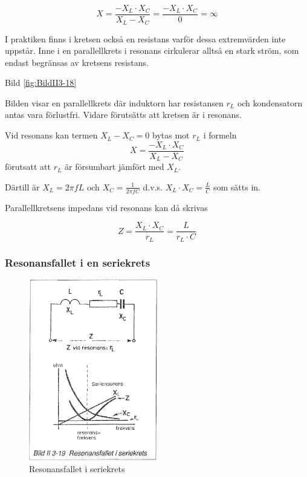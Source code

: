 \[
  X = \frac{-X_L \cdot X_C}{X_L - X_C}
  = \frac{-X_L \cdot X_C}{0}
  = \infty
\]

I praktiken finns i kretsen också en resistans varför dessa extremvärden inte
uppstår. Inne i en parallellkrets i resonans cirkulerar alltså en stark ström,
som endast begränsas av kretsens resistans.

Bild \ref{fig:BildII3-18}

Bilden visar en parallellkrets där induktorn har resistansen \(r_L\) och
kondensatorn antas vara förlustfri. Vidare förutsätts att kretsen är i resonans.

Vid resonans kan termen \(X_L - X_C = 0\) bytas mot \(r_L\) i formeln
\[X = \frac{-X_L \cdot X_C}{X_L - X_C}\] förutsatt att \(r_L\) är försumbart
jämfört med \(X_L\).

Därtill är \(X_L = 2πfL\) och \(X_C = \frac{1}{2πfC}\) d.v.s.
\(X_L \cdot X_C = \frac{L}{C}\) som sätts in.

Parallellkretsens impedans vid resonans kan då skrivas

\[
Z = \frac{X_L \cdot X_C}{r_L} = \frac{L}{r_L \cdot C}
\]

\subsubsection{Resonansfallet i en seriekrets}
\label{serieresonans}

\begin{figure}
\includegraphics[width=0.5\textwidth]{images/bild_2_3-19}
\caption{Resonansfallet i seriekrets}
\label{fig:BildII3-19}
\end{figure}

